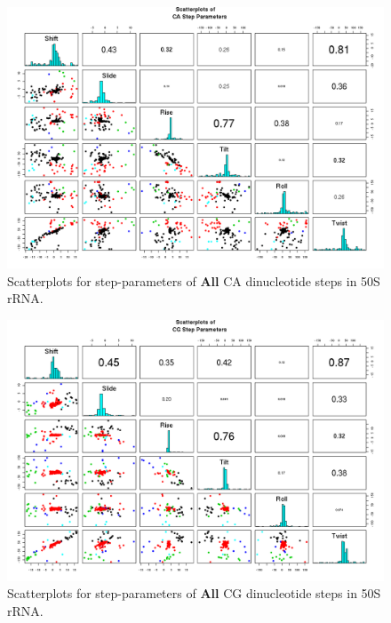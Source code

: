 \begin{figure}[H]
\centering
\includegraphics[angle=90, scale=0.6]{All/CA.png}
\caption{Scatterplots for step-parameters of \textbf{All} CA dinucleotide steps
in 50S rRNA.}
\label{fig:stepsCA}
\end{figure}

\begin{figure}[H]
\centering
\includegraphics[angle=90, scale=0.6]{All/CG.png}
\caption{Scatterplots for step-parameters of \textbf{All} CG dinucleotide steps
in 50S rRNA.}
\label{fig:stepsCG}
\end{figure}

